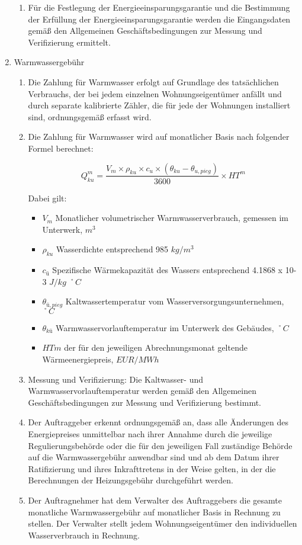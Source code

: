 \begin{enumerate}
\begin{enumerate}
\item Für die Festlegung der Energieeinsparungsgarantie und die Bestimmung der Erfüllung der Energieeinsparungsgarantie werden die Eingangsdaten gemäß den Allgemeinen Geschäftsbedingungen zur Messung und Verifizierung ermittelt. 

\end{enumerate}

\item{Warmwassergebühr}

\begin{enumerate}

	\item Die Zahlung für Warmwasser erfolgt auf Grundlage des tatsächlichen Verbrauchs, der bei jedem einzelnen Wohnungseigentümer anfällt und durch separate kalibrierte Zähler, die für jede der Wohnungen installiert sind, ordnungsgemäß erfasst wird.
	\item Die Zahlung für Warmwasser wird auf monatlicher Basis nach folgender Formel berechnet:

          \[ Q^{m}_{ku} = \frac{V_m \times \rho_{ku} \times c_u \times \left(\theta_{ku} - \theta_{u,pieg}\right)}{3600} \times HT^m \]

          Dabei gilt:

          \begin{itemize}[label={}]
	\item $V_m$ \quad  Monatlicher volumetrischer Warmwasserverbrauch, gemessen im Unterwerk, $m^3$
        \item $\rho_{ku}$ \quad \quad Wasserdichte entsprechend 985 $kg/m^3$
	\item $c_ū$ \quad \quad Spezifische Wärmekapazität des Wassers entsprechend 4.1868 x 10-3 $J/kg$ $˚C$
	\item $θ_{ū,pieg}$ \quad Kaltwassertemperatur vom Wasserversorgungsunternehmen, $˚C$
	\item $θ_{kū}$ \quad \quad Warmwasservorlauftemperatur im Unterwerk des Gebäudes, $˚C$
	\item $HTm$ \quad der für den jeweiligen Abrechnungsmonat geltende Wärmeenergiepreis, $EUR/MWh$
          \end{itemize}

	\item Messung und Verifizierung: Die Kaltwasser- und Warmwasservorlauftemperatur werden gemäß den Allgemeinen Geschäftsbedingungen zur Messung und Verifizierung  bestimmt.
        \item Der Auftraggeber erkennt ordnungsgemäß an, dass alle Änderungen des Energiepreises unmittelbar nach ihrer Annahme durch die jeweilige Regulierungsbehörde oder die für den jeweiligen Fall zuständige Behörde auf die Warmwassergebühr anwendbar sind und ab dem Datum ihrer Ratifizierung und ihres Inkrafttretens in der Weise gelten, in der die Berechnungen der Heizungsgebühr durchgeführt werden.
        \item Der Auftragnehmer hat dem Verwalter des Auftraggebers die gesamte monatliche Warmwassergebühr auf monatlicher Basis in Rechnung zu stellen. Der Verwalter stellt jedem Wohnungseigentümer den individuellen Wasserverbrauch in Rechnung.



\end{enumerate}
\end{enumerate}
